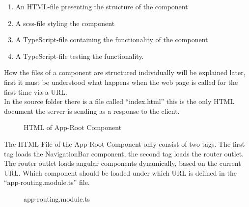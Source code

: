 \begin{enumerate}
    \item An HTML-file presenting the structure of the component
    \item A scss-file styling the component
    \item A TypeScript-file containing the functionality of the component
    \item A TypeScript-file testing the functionality.
\end{enumerate}

How the files of a component are structured individually will be explained later, first it must be understood what
happens when the web page is called for the first time via a URL. \\
In the source folder there is a file called \enquote{index.html} this is the only HTML document the server is sending
as a response to the client.

\begin{figure}[H]
    \centering
    \caption{HTML of App-Root Component}
    \label{fig:htmlapproot}
\end{figure}

The HTML-File of the App-Root Component only consist of two tags.
The first tag loads the NavigationBar component, the second tag loads the router outlet.
The router outlet loads angular components dynamically, based on the current URL.
Which component should be loaded under which URL is defined in the \enquote{app-routing.module.ts} file.

\begin{figure}[H]
    \centering
    \caption{app-routing.module.ts}
    \label{fig:approutingmodule}
\end{figure}

